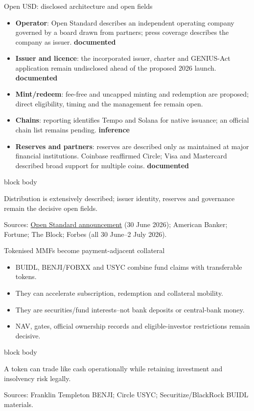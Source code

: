\documentclass[aspectratio=169,12pt]{beamer}
\newcommand{\rust}[1]{\textcolor{Rust}{\textbf{#1}}}
\newcommand{\source}[1]{\vfill\par\fontsize{5.4}{6.5}\selectfont\color{Quiet}Sources: #1}
\newcommand{\tightitems}{\setlength{\itemsep}{0.42em}\setlength{\parskip}{0pt}}
\newcommand{\verytightitems}{\setlength{\itemsep}{0.22em}\setlength{\parskip}{0pt}}
\newcommand{\tdoc}{\textcolor{Sage}{\bfseries documented}}
\newcommand{\tinf}{\textcolor{Ocean}{\bfseries inference}}
\newenvironment{statement}{%
  \begin{beamercolorbox}[sep=.18cm,rounded=false,wd=\linewidth]{block body}%
  \fontsize{13}{15.5}\selectfont\bfseries
}{\end{beamercolorbox}}
\begin{document}
\begin{frame}[shrink=12]{Open USD: disclosed architecture and open fields}
  \fontsize{9.2}{11}\selectfont
  \begin{itemize}\verytightitems
    \item \rust{Operator}: Open Standard describes an independent operating company governed by a board drawn from partners; press coverage describes the company as issuer. \tdoc
    \item \rust{Issuer and licence}: the incorporated issuer, charter and GENIUS-Act application remain undisclosed ahead of the proposed 2026 launch. \tdoc
    \item \rust{Mint/redeem}: fee-free and uncapped minting and redemption are proposed; direct eligibility, timing and the management fee remain open.
    \item \rust{Chains}: reporting identifies Tempo and Solana for native issuance; an official chain list remains pending. \tinf
    \item \rust{Reserves and partners}: reserves are described only as maintained at major financial institutions. Coinbase reaffirmed Circle; Visa and Mastercard described broad support for multiple coins. \tdoc
  \end{itemize}
  \begin{statement}
    Distribution is extensively described; issuer identity, reserves and governance remain the decisive open fields.
  \end{statement}
  \source{\href{https://joinopenstandard.com/blog/introducing-open-usd}{Open Standard announcement} (30 June 2026); American Banker; Fortune; The Block; Forbes (all 30 June--2 July 2026).}
\end{frame}

\begin{frame}{Tokenised MMFs become payment-adjacent collateral} %
  \begin{itemize}\tightitems
    \item BUIDL, BENJI/FOBXX and USYC combine fund claims with transferable tokens.
    \item They can accelerate subscription, redemption and collateral mobility.
    \item They are securities/fund interests--not bank deposits or central-bank money.
    \item NAV, gates, official ownership records and eligible-investor restrictions remain decisive.
  \end{itemize}
  \begin{statement}
    A token can trade like cash operationally while retaining investment and insolvency risk legally.
  \end{statement}
  \source{Franklin Templeton BENJI; Circle USYC; Securitize/BlackRock BUIDL materials.}
\end{frame}
\end{document}
